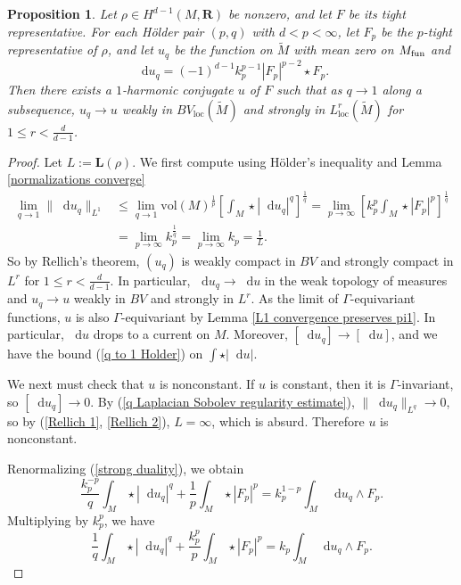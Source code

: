 \documentclass[reqno,11pt]{amsart}
\newcommand{\RR}{\mathbf{R}}
\newcommand*\dif{\mathop{}\!\mathrm{d}}
\newcommand{\vol}{\mathrm{vol}}
\newcommand{\Comass}{\mathbf L}
\newcommand{\loc}{\mathrm{loc}}
\newtheorem{proposition}[theorem]{Proposition}
\theoremstyle{definition}
\numberwithin{equation}{section}
\begin{document}
\begin{proposition}\label{existence 1}
Let $\rho \in H^{d - 1}(M, \RR)$ be nonzero, and let $F$ be its tight representative.
For each H\"older pair $(p, q)$ with $d < p < \infty$, let $F_p$ be the $p$-tight representative of $\rho$, and let $u_q$ be the function on $\tilde M$ with mean zero on $M_{\rm fun}$ and
$$\dif u_q = (-1)^{d - 1} k_p^{p - 1} |F_p|^{p - 2} \star F_p.$$
Then there exists a $1$-harmonic conjugate $u$ of $F$ such that as $q \to 1$ along a subsequence, $u_q \to u$ weakly in $BV_\loc(\tilde M)$ and strongly in $L^r_\loc(\tilde M)$ for $1 \leq r < \frac{d}{d - 1}$.
\end{proposition}
\begin{proof}
Let $L := \Comass(\rho)$.
We first compute using H\"older's inequality and Lemma \ref{normalizations converge}
\begin{align}
\lim_{q \to 1} \|\dif u_q\|_{L^1}
&\leq \lim_{q \to 1} \vol(M)^{\frac{1}{p}} \left[\int_M \star |\dif u_q|^q\right]^{\frac{1}{q}} = \lim_{p \to \infty} \left[k_p^p \int_M \star |F_p|^p\right]^{\frac{1}{q}} \label{Rellich 1}\\
&= \lim_{p \to \infty} k_p^{\frac{1}{q}} = \lim_{p \to \infty} k_p = \frac{1}{L} \label{Rellich 2}.
\end{align}
So by Rellich's theorem, $(u_q)$ is weakly compact in $BV$ and strongly compact in $L^r$ for $1 \leq r < \frac{d}{d - 1}$.
In particular, $\dif u_q \to \dif u$ in the weak topology of measures and $u_q \to u$ weakly in $BV$ and strongly in $L^r$.
As the limit of $\Gamma$-equivariant functions, $u$ is also $\Gamma$-equivariant by Lemma \ref{L1 convergence preserves pi1}.
In particular, $\dif u$ drops to a current on $M$.
Moreover, $[\dif u_q] \to [\dif u]$, and we have the bound (\ref{q to 1 Holder}) on $\int \star |\dif u|$.

We next must check that $u$ is nonconstant.
If $u$ is constant, then it is $\Gamma$-invariant, so $[\dif u_q] \to 0$.
By (\ref{q Laplacian Sobolev regularity estimate}), $\|\dif u_q\|_{L^q} \to 0$, so by (\ref{Rellich 1}, \ref{Rellich 2}), $L = \infty$, which is absurd.
Therefore $u$ is nonconstant.

Renormalizing (\ref{strong duality}), we obtain 
$$\frac{k_p^{-p}}{q} \int_M \star |\dif u_q|^q + \frac{1}{p} \int_M \star |F_p|^p = k_p^{1 - p} \int_M \dif u_q \wedge F_p.$$
Multiplying by $k_p^p$, we have 
\begin{equation}\label{1 strong duality before limits}
	\frac{1}{q} \int_M \star |\dif u_q|^q + \frac{k_p^p}{p} \int_M \star |F_p|^p = k_p \int_M \dif u_q \wedge F_p.
\end{equation}


\end{proof}
\end{document}
